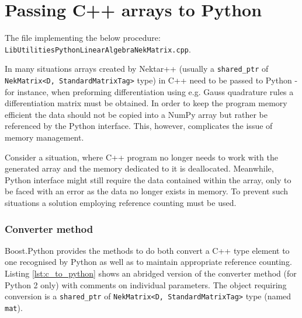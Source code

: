 \section{Passing C++ arrays to Python}
The file implementing the below procedure: \texttt{LibUtilities\/Python\/LinearAlgebra\/NekMatrix.cpp}.

In many situations arrays created by Nektar++ (usually a \texttt{shared\_ptr} of 
\texttt{NekMatrix<D, StandardMatrixTag>} type) in C++ need to be passed to Python - 
for instance, when preforming differentiation using e.g. Gauss quadrature rules a 
differentiation matrix must be obtained. In order to keep the program memory efficient 
the data should not be copied into a NumPy array but rather be referenced by the Python 
interface. This, however, complicates the issue of memory management.

Consider a situation, where C++ program no longer needs to work with the generated array 
and the memory dedicated to it is deallocated. Meanwhile, Python interface might still require 
the data contained within the array, only to be faced with an error as the data no longer 
exists in memory. To prevent such situations a solution employing reference counting must be used.

\subsubsection{Converter method}

Boost.Python provides the methods to do both convert a C++ type element to one recognised by 
Python as well as to maintain appropriate reference counting. Listing \ref{lst:c_to_python} 
shows an abridged version of the converter method (for Python 2 only) with comments on 
individual parameters. The object requiring conversion is a \texttt{shared\_ptr} of 
\texttt{NekMatrix<D, StandardMatrixTag>} type (named \texttt{mat}).

